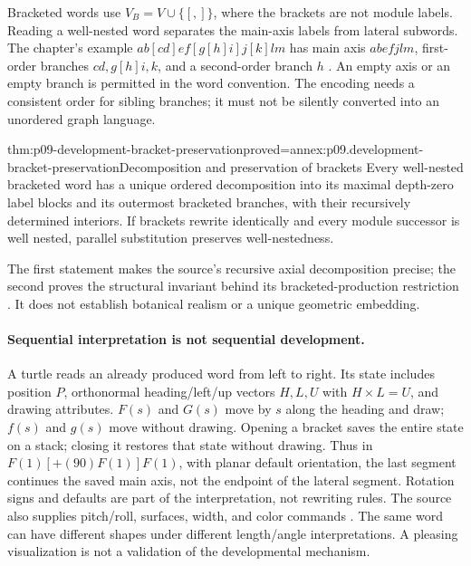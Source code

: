 Bracketed words use \(V_B=V\cup\{[,]\}\), where the brackets are not module
labels. Reading a well-nested word separates the main-axis labels from
lateral subwords. The chapter's example
\(ab[cd]ef[g[h]i]j[k]lm\) has main axis \(abefjlm\), first-order branches
\(cd,g[h]i,k\), and a second-order branch \(h\)
\cite[p.~542]{PrusinkiewiczEtAl1997DevelopmentIntake}.
An empty axis or an empty branch is permitted in the word convention.
The encoding needs a consistent order for sibling branches; it must not be
silently converted into an unordered graph language.

\begin{hbtheorem}{thm:p09-development-bracket-preservation}{proved=annex:p09.development-bracket-preservation}{Decomposition and preservation of brackets}
Every well-nested bracketed word has a unique ordered decomposition into
its maximal depth-zero label blocks and its outermost bracketed branches,
with their recursively determined interiors.
If brackets rewrite identically and every module successor is well nested,
parallel substitution preserves well-nestedness.
\end{hbtheorem}

The first statement makes the source's recursive axial decomposition precise;
the second proves the structural invariant behind its bracketed-production
restriction \cite[pp.~541--542,548]{PrusinkiewiczEtAl1997DevelopmentIntake}.
It does not establish botanical realism or a unique geometric embedding.

\paragraph{Sequential interpretation is not sequential development.}
A turtle reads an already produced word from left to right.
Its state includes position \(P\), orthonormal heading/left/up vectors
\(H,L,U\) with \(H\times L=U\), and drawing attributes.
\(F(s)\) and \(G(s)\) move by \(s\) along the heading and draw;
\(f(s)\) and \(g(s)\) move without drawing. Opening a bracket saves the
entire state on a stack; closing it restores that state without drawing.
Thus in \(F(1)[+(90)F(1)]F(1)\), with planar default orientation, the last
segment continues the saved main axis, not the endpoint of the lateral
segment. Rotation signs and defaults are part of the interpretation, not
rewriting rules. The source also supplies pitch/roll, surfaces, width, and
color commands \cite[pp.~543--545]{PrusinkiewiczEtAl1997DevelopmentIntake}.
The same word can have different shapes under different length/angle
interpretations. A pleasing visualization is not a validation of the
developmental mechanism.



